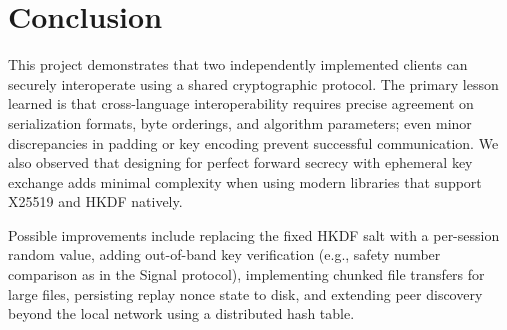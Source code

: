 \documentclass[sigconf,nonacm]{acmart}
\begin{document}
\section{Conclusion}
\label{sec:conclusion}

This project demonstrates that two independently implemented clients can securely interoperate using a shared cryptographic protocol.
The primary lesson learned is that cross-language interoperability requires precise agreement on serialization formats, byte orderings, and algorithm parameters; even minor discrepancies in padding or key encoding prevent successful communication.
We also observed that designing for perfect forward secrecy with ephemeral key exchange adds minimal complexity when using modern libraries that support X25519 and HKDF natively.

Possible improvements include replacing the fixed HKDF salt with a per-session random value, adding out-of-band key verification (e.g., safety number comparison as in the Signal protocol), implementing chunked file transfers for large files, persisting replay nonce state to disk, and extending peer discovery beyond the local network using a distributed hash table.




\end{document}

